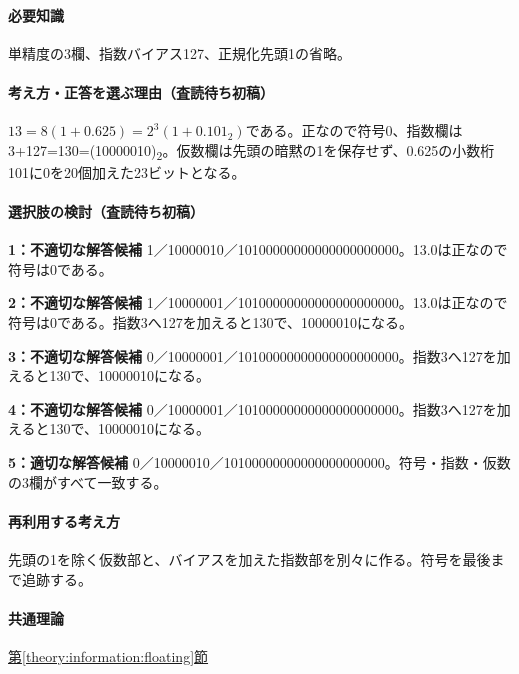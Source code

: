 \paragraph{必要知識} 単精度の3欄、指数バイアス127、正規化先頭1の省略。

\paragraph{考え方・正答を選ぶ理由（査読待ち初稿）} \(13=8(1+0.625)=2^3(1+0.101_2)\)である。正なので符号0、指数欄は3+127=\allowbreak{}130=\allowbreak{}(10000010)\textsubscript{2}。仮数欄は先頭の暗黙の1を保存せず、0.625の小数桁101に0を20個加えた23ビットとなる。

\paragraph{選択肢の検討（査読待ち初稿）}\mbox{}\par

\noindent\textbf{1：不適切な解答候補} 1／10000010／10100000000000000000000。13.0は正なので符号は0である。\par

\noindent\textbf{2：不適切な解答候補} 1／10000001／10100000000000000000000。13.0は正なので符号は0である。指数3へ127を加えると130で、10000010になる。\par

\noindent\textbf{3：不適切な解答候補} 0／10000001／10100000000000000000000。指数3へ127を加えると130で、10000010になる。\par

\noindent\textbf{4：不適切な解答候補} 0／10000001／10100000000000000000000。指数3へ127を加えると130で、10000010になる。\par

\noindent\textbf{5：適切な解答候補} 0／10000010／10100000000000000000000。符号・指数・仮数の3欄がすべて一致する。\par

\paragraph{再利用する考え方} 先頭の1を除く仮数部と、バイアスを加えた指数部を別々に作る。符号を最後まで追跡する。

\paragraph{共通理論} \hyperref[theory:information:floating]{第\ref*{theory:information:floating}節}


